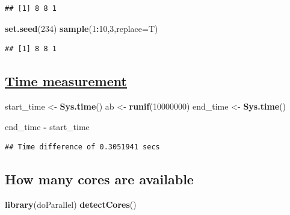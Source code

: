 \documentclass[10pt,]{article}
\newenvironment{Shaded}{\begin{snugshade}}{\end{snugshade}}
\newcommand{\KeywordTok}[1]{\textcolor[rgb]{0.13,0.29,0.53}{\textbf{#1}}}
\newcommand{\DataTypeTok}[1]{\textcolor[rgb]{0.13,0.29,0.53}{#1}}
\newcommand{\DecValTok}[1]{\textcolor[rgb]{0.00,0.00,0.81}{#1}}
\newcommand{\StringTok}[1]{\textcolor[rgb]{0.31,0.60,0.02}{#1}}
\newcommand{\OperatorTok}[1]{\textcolor[rgb]{0.81,0.36,0.00}{\textbf{#1}}}
\newcommand{\NormalTok}[1]{#1}
\begin{document}
\begin{verbatim}
## [1] 8 8 1
\end{verbatim}

\begin{Shaded}
\begin{Highlighting}[]
\KeywordTok{set.seed}\NormalTok{(}\DecValTok{234}\NormalTok{)}
\KeywordTok{sample}\NormalTok{(}\DecValTok{1}\OperatorTok{:}\DecValTok{10}\NormalTok{,}\DecValTok{3}\NormalTok{,}\DataTypeTok{replace=}\NormalTok{T)}
\end{Highlighting}
\end{Shaded}

\begin{verbatim}
## [1] 8 8 1
\end{verbatim}

\subsection{\texorpdfstring{\href{https://www.r-bloggers.com/5-ways-to-measure-running-time-of-r-code/}{Time
measurement}}{Time measurement}}\label{time-measurement}

\begin{Shaded}
\begin{Highlighting}[]
\NormalTok{start_time <-}\StringTok{ }\KeywordTok{Sys.time}\NormalTok{()}
\NormalTok{ab <-}\StringTok{ }\KeywordTok{runif}\NormalTok{(}\DecValTok{10000000}\NormalTok{)}
\NormalTok{end_time <-}\StringTok{ }\KeywordTok{Sys.time}\NormalTok{()}

\NormalTok{end_time }\OperatorTok{-}\StringTok{ }\NormalTok{start_time}
\end{Highlighting}
\end{Shaded}

\begin{verbatim}
## Time difference of 0.3051941 secs
\end{verbatim}

\subsection{How many cores are
available}\label{how-many-cores-are-available}

\begin{Shaded}
\begin{Highlighting}[]
\KeywordTok{library}\NormalTok{(doParallel)}
\KeywordTok{detectCores}\NormalTok{()}
\end{Highlighting}
\end{Shaded}
\end{document}
